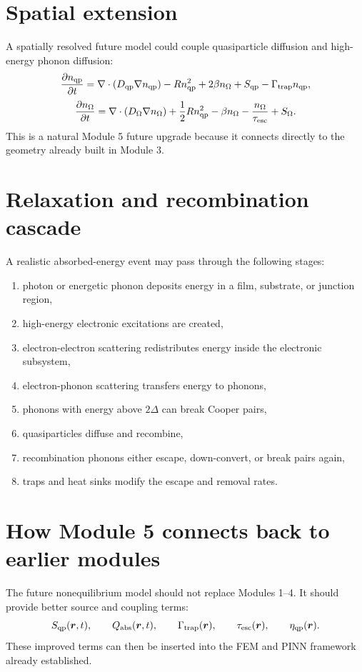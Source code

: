 \documentclass[11pt]{article}
\begin{document}
\section{Spatial extension}
A spatially resolved future model could couple quasiparticle diffusion and high-energy phonon diffusion:
\begin{equation}
\frac{\partial n_{\mathrm{qp}}}{\partial t}
=\nabla\cdot(D_{\mathrm{qp}}\nabla n_{\mathrm{qp}})-R n_{\mathrm{qp}}^2+2\beta n_\Omega+S_{\mathrm{qp}}-\Gamma_{\mathrm{trap}}n_{\mathrm{qp}},
\end{equation}
\begin{equation}
\frac{\partial n_\Omega}{\partial t}
=\nabla\cdot(D_\Omega\nabla n_\Omega)+\frac{1}{2}R n_{\mathrm{qp}}^2-\beta n_\Omega-\frac{n_\Omega}{\tau_{\mathrm{esc}}}+S_\Omega.
\end{equation}
This is a natural Module 5 future upgrade because it connects directly to the geometry already built in Module 3.

\section{Relaxation and recombination cascade}
A realistic absorbed-energy event may pass through the following stages:
\begin{enumerate}[leftmargin=1.6em]
    \item photon or energetic phonon deposits energy in a film, substrate, or junction region,
    \item high-energy electronic excitations are created,
    \item electron-electron scattering redistributes energy inside the electronic subsystem,
    \item electron-phonon scattering transfers energy to phonons,
    \item phonons with energy above $2\Delta$ can break Cooper pairs,
    \item quasiparticles diffuse and recombine,
    \item recombination phonons either escape, down-convert, or break pairs again,
    \item traps and heat sinks modify the escape and removal rates.
\end{enumerate}

\section{How Module 5 connects back to earlier modules}
The future nonequilibrium model should not replace Modules 1--4. It should provide better source and coupling terms:
\begin{equation}
S_{\mathrm{qp}}(\bm{r},t),\qquad Q_{\mathrm{abs}}(\bm{r},t),\qquad \Gamma_{\mathrm{trap}}(\bm{r}),\qquad \tau_{\mathrm{esc}}(\bm{r}),\qquad \eta_{\mathrm{qp}}(\bm{r}).
\end{equation}
These improved terms can then be inserted into the FEM and PINN framework already established.
\end{document}
